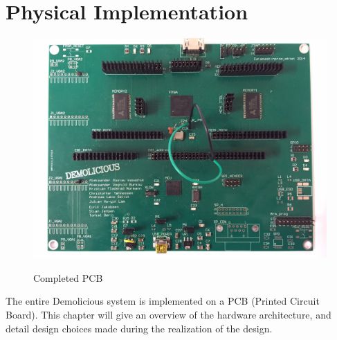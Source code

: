 \documentclass[../main/report.tex]{subfiles}
\begin{document}
\chapter{Physical Implementation}
\label{sec:pcb}

\begin{figure}[H]
    \centering
    \includegraphics[width=\textwidth]{../pcb/assets/pcb-full.jpg}
    \label{fig:pcb-full}
    \caption{Completed PCB}
\end{figure}

The entire Demolicious system is implemented on a PCB (Printed Circuit Board).
This chapter will give an overview of the hardware architecture,
and detail design choices made during the realization of the design.














\end{document}
